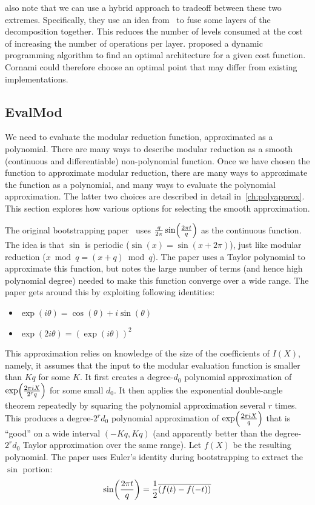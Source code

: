 \documentclass[../fheimpl.tex]{subfiles}
\begin{document}
    \cite{cryptoeprint:2018/1043,cryptoeprint:2018/1073} also note that we can use a hybrid approach to tradeoff between these two extremes. Specifically, they use an idea from~\cite{cryptoeprint:2014/106} to fuse some layers of the decomposition together. This reduces the number of levels consumed at the cost of increasing the number of operations per layer. \cite{cryptoeprint:2014/106} proposed a dynamic programming algorithm to find an optimal architecture for a given cost function. Cornami could therefore choose an optimal point that may differ from existing implementations.

    \subsection{EvalMod}
    We need to evaluate the modular reduction function, approximated as a polynomial. There are many ways to describe modular reduction as a smooth (continuous and differentiable) non-polynomial function. Once we have chosen the function to approximate modular reduction, there are many ways to approximate the function as a polynomial, and many ways to evaluate the polynomial approximation. The latter two choices are described in detail in~\cref{ch:polyapprox}. This section explores how various options for selecting the smooth approximation.
    
    The original bootstrapping paper~\cite{cryptoeprint:2018/153} uses $\frac{q}{2\pi}\sin\parens*{\frac{2\pi t}{q}}$ as the continuous function. The idea is that $\sin$ is periodic ($\sin(x) = \sin(x+2\pi)$), just like modular reduction ($x \bmod q = (x+q) \bmod q$). The paper uses a Taylor polynomial to approximate this function, but notes the large number of terms (and hence high polynomial degree) needed to make this function converge over a wide range. The paper gets around this by exploiting following identities:
    \begin{itemize}
        \item $\exp(i\theta) = \cos(\theta)+i\sin(\theta)$
        \item $\exp(2i\theta) = (\exp(i\theta))^2$
    \end{itemize}
    This approximation relies on knowledge of the size of the coefficients of $I(X)$, namely, it assumes that the input to the modular evaluation function is smaller than $Kq$ for some $K$. It first creates a degree-$d_0$ polynomial approximation of $\exp\parens*{\frac{2\pi iX}{2^r q}}$ for some small $d_0$. It then applies the exponential double-angle theorem repeatedly by squaring the polynomial approximation several $r$ times. This produces a degree-$2^rd_0$ polynomial approximation of $\exp\parens*{\frac{2\pi iX}{q}}$ that is ``good'' on a wide interval $(-Kq, Kq)$ (and apparently better than the degree-$2^rd_0$ Taylor approximation over the same range). Let $f(X)$ be the resulting polynomial. The paper uses Euler's identity during bootstrapping to extract the $\sin$ portion: 
    \[\sin\parens*{\frac{2\pi t}{q}} =\frac{1}{2}\overline{\parens*{f(t) - f(-t)}}\]
    
\end{document}
